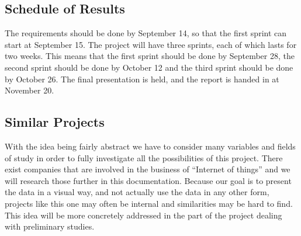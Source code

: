 \documentclass[../document.tex]{subfiles}
\begin{document}
\subsection{Schedule of Results}
The requirements should be done by September 14, so that the first sprint can start at September 15. The project will have three sprints, each of which lasts for two weeks. This means that the first sprint should be done by September 28, the second sprint should be done by October 12 and the third sprint should be done by October 26. The final presentation is held, and the report is handed in at November 20.

\subsection{Similar Projects}
With the idea being fairly abstract we have to consider many variables and fields of study in order to fully investigate all the possibilities of this project. There exist companies that are involved in the business of “Internet of things” and we will research those further in this documentation. Because our goal is to present the data in a visual way, and not actually use the data in any other form, projects like this one may often be internal and similarities may be hard to find. This idea will be more concretely addressed in the part of the project dealing with preliminary studies.
\end{document}
